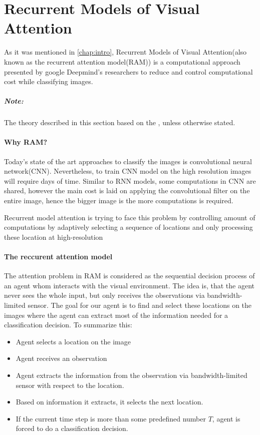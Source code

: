 \section{Recurrent Models of Visual Attention}
\label{sec:ram_model}
As it was mentioned in \autoref{chap:intro}, Recurrent Models of Visual
Attention(also known as the recurrent attention model(\gls{RAM})) is
a computational approach presented by google Deepmind’s researchers to reduce
and control computational cost while classifying images.
\subparagraph{Note: } The theory described in this section based on the
\cite{DBLP:journals/corr/MnihHGK14}, unless otherwise stated.

\paragraph{Why \gls{RAM}?}
Today's state of the art approaches to classify the images is convolutional
neural network(\gls{CNN}). Nevertheless, to train \gls{CNN} model on the high resolution
images will require days of time. Similar to RNN models, some computations
in \gls{CNN} are shared, however the main cost is laid on applying the convolutional
filter on the entire image, hence the bigger image is the
more computations is required.\cite{Krizhevsky2012}

Recurrent model attention is trying to face this problem by
controlling amount of computations by adaptively selecting a sequence of
locations and only processing these location at high-resolution


\paragraph{The reccurent attention model}
The attention problem in \gls{RAM} is considered as the sequential decision
process of an agent whom interacts with the visual environment. The idea is,
that the agent never sees the whole input, but only receives the observations
via bandwidth-limited sensor. The goal for our agent is
to find and select these locations on the images where the agent can extract
most of the information needed for a classification decision.
To summarize this:
\begin{itemize}
	\item Agent selects a location on the image
	\item Agent receives an observation
	\item Agent extracts the information from the observation via bandwidth-limited
		sensor with respect to the location.
	\item Based on information it extracts, it selects the next location.
	\item If the current time step is
		more than some predefined number $T$, agent is forced to do a
		classification decision.
\end{itemize}

